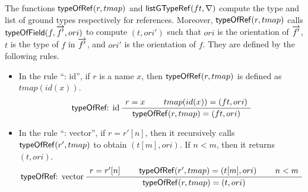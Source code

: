 The functions ${\sf typeOfRef}(r, tmap)$ and ${\sf listGTypeRef}(ft, \nabla)$ compute the type and list of ground types respectively for references. 
Moreover, ${\sf typeOfRef}(r, tmap)$ calls ${\sf typeOfField}(f, \overrightarrow{f'}, ori)$ to compute $(t, ori')$ such that $ori$ is the orientation of $\overrightarrow{f'}$, $t$ is the type of $f$ in $\overrightarrow{f'}$, and $ori'$ is the orientation of $f$. 
They are defined by the following rules.
\begin{itemize}
	\item In the rule ``{\typeofref: id}'', if $r$ is a name $x$, then ${\sf typeOfRef}(r, tmap) $ is defined as $tmap(id(x))$. 
	\begin{gather*}
		\inferii[\typeofref: id]
		{\seqq{\typeofref(r, tmap) = (ft, ori)}}
		{\seqq{r = x}} {\seqq{tmap(id(x)) = (ft, ori)}}
	\end{gather*}
	\item In the rule ``{\typeofref: vector}'', if $r= r'[n]$, then it recursively calls ${\sf typeOfRef}(r', tmap)$ to obtain $(t[m], ori)$. If $n  < m$, then it returns $(t, ori)$. 
	\begin{gather*}
		\inferiii[\typeofref: vector]
		{\seqq{\typeofref(r, tmap) = (t, ori)}}
		{\seqq{r = r'[n]}} {\seqq{\typeofref(r', tmap) =  (t[m], ori)}} {\seqq{n < m}}
	\end{gather*}
	

\end{itemize}
